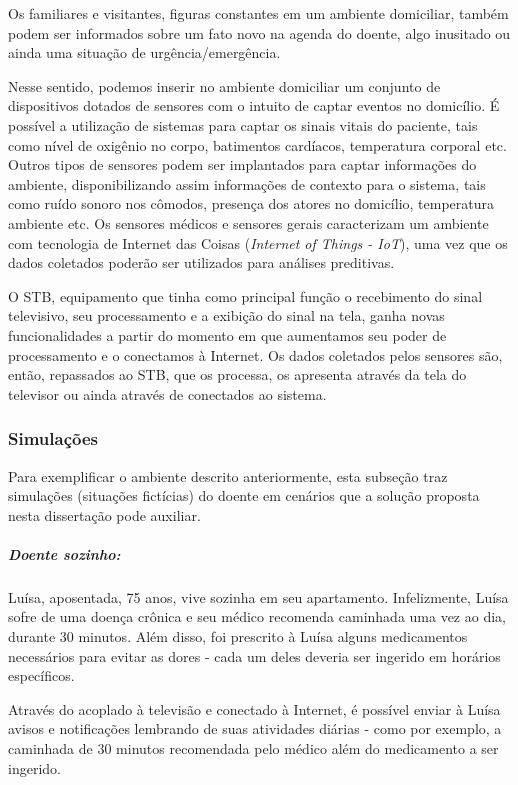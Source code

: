 Os familiares e visitantes, figuras constantes em um ambiente domiciliar, também
podem ser informados sobre um fato novo na agenda do doente, algo inusitado ou 
ainda uma situação de urgência/emergência.

Nesse sentido, podemos inserir no ambiente domiciliar um conjunto de
dispositivos dotados de sensores com o intuito de captar eventos no domicílio. É
possível a utilização de sistemas para captar os sinais vitais do paciente, tais
como nível de oxigênio no corpo, batimentos cardíacos, temperatura corporal etc.
Outros tipos de sensores podem ser implantados para captar informações do
ambiente, disponibilizando assim informações de contexto para o sistema,  tais
como ruído sonoro nos cômodos, presença dos atores no domicílio, temperatura
ambiente etc. Os sensores médicos e sensores gerais caracterizam um  ambiente 
com tecnologia de Internet das Coisas (\textit{Internet of Things  - IoT}), uma
vez que os dados coletados poderão ser utilizados para análises preditivas.

O STB, equipamento que tinha como principal função o recebimento do sinal
televisivo, seu processamento e a exibição do sinal na tela, ganha novas
funcionalidades a partir do momento em que aumentamos seu  poder de
processamento e o conectamos à Internet. Os dados coletados pelos sensores são,
então, repassados ao STB, que os processa, os apresenta através da tela do
televisor ou ainda através de \smartphones[] conectados ao sistema.

\subsubsection{Simulações} \label{subsubsec:simulacoes-A}

Para exemplificar o ambiente descrito anteriormente, esta subseção
traz simulações (situações fictícias) do doente em cenários que a solução
proposta nesta dissertação pode auxiliar.

\subparagraph{Doente sozinho:}

Luísa, aposentada, 75 anos, vive sozinha em seu apartamento. Infelizmente,
Luísa sofre de uma doença crônica e seu médico recomenda caminhada uma vez ao
dia, durante 30 minutos.  Além disso, foi prescrito à Luísa alguns medicamentos
necessários para evitar as dores - cada um deles deveria ser ingerido em
horários específicos.

Através do \stb[] acoplado à televisão e conectado à Internet, é
possível enviar à Luísa avisos e notificações lembrando de suas atividades
diárias - como por exemplo, a caminhada de 30 minutos recomendada pelo
médico além do medicamento a ser ingerido.

